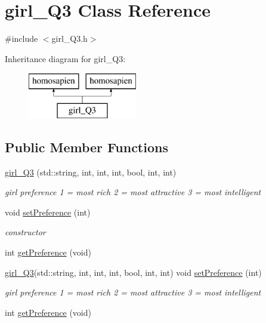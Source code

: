 \hypertarget{classgirl___q3}{}\section{girl\+\_\+\+Q3 Class Reference}
\label{classgirl___q3}


{\ttfamily \#include $<$girl\+\_\+\+Q3.\+h$>$}

Inheritance diagram for girl\+\_\+\+Q3\+:\begin{figure}[H]
\begin{center}
\leavevmode
\includegraphics[height=2.000000cm]{classgirl___q3}
\end{center}
\end{figure}
\subsection*{Public Member Functions}
\begin{DoxyCompactItemize}
\item 
\hyperlink{classgirl___q3_a2c595ffa07045ad1d7d22ffcc36723a7}{girl\+\_\+\+Q3} (std\+::string, int, int, int, bool, int, int)
\begin{DoxyCompactList}\small\item\em girl preference \textquotesingle{}1\textquotesingle{} = most rich \textquotesingle{}2\textquotesingle{} = most attractive \textquotesingle{}3\textquotesingle{} = most intelligent \end{DoxyCompactList}\item 
void \hyperlink{classgirl___q3_a63eb2d16b6ea6c9c136b376bdfc1c85b}{set\+Preference} (int)
\begin{DoxyCompactList}\small\item\em constructor \end{DoxyCompactList}\item 
int \hyperlink{classgirl___q3_a95dbbddc79b5155a877e12e6352e08af}{get\+Preference} (void)
\item 
\hyperlink{classgirl___q3}{girl\+\_\+\+Q3}(std\+::string, int, int, int, bool, int, int) void \hyperlink{classgirl___q3_aeda05a4272fa1b371c7bbb2285b64e63}{set\+Preference} (int)
\begin{DoxyCompactList}\small\item\em girl preference \textquotesingle{}1\textquotesingle{} = most rich \textquotesingle{}2\textquotesingle{} = most attractive \textquotesingle{}3\textquotesingle{} = most intelligent \end{DoxyCompactList}\item 
int \hyperlink{classgirl___q3_a95dbbddc79b5155a877e12e6352e08af}{get\+Preference} (void)
\end{DoxyCompactItemize}
